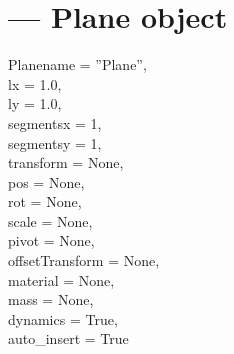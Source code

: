 
\section{ ---
         Plane object}

\begin{classdesc}{Plane}{name = ''Plane'',\\ 
                       lx = 1.0,\\
                       ly = 1.0,\\
                       segmentsx = 1,\\
                       segmentsy = 1,\\
                       transform = None,\\
                       pos = None,\\
                       rot = None,\\
                       scale = None,\\
                       pivot = None,\\
                       offsetTransform = None,\\
                       material = None,\\
                       mass = None,\\
                       dynamics = True,\\
                       auto_insert = True}

\end{classdesc}


